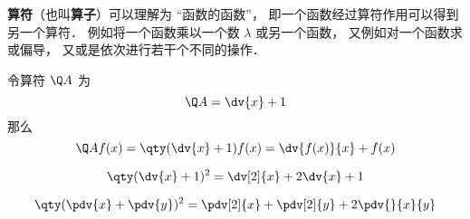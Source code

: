 

\textbf{算符}（也叫\textbf{算子}）可以理解为 “函数的函数”， 即一个函数经过算符作用可以得到另一个算符． 例如将一个函数乘以一个数 $\lambda$ 或另一个函数， 又例如对一个函数求或偏导， 又或是依次进行若干个不同的操作．

\begin{example}{}
令算符 $\Q A$ 为
\begin{equation}
\Q A = \dv{x} + 1
\end{equation}
那么
\begin{equation}
\Q A f(x) = \qty(\dv{x} + 1)f(x) = \dv{f(x)}{x} + f(x)
\end{equation}
\end{example}



\begin{equation}
\qty(\dv{x} + 1)^2 = \dv[2]{x} + 2\dv{x} + 1
\end{equation}

\begin{equation}
\qty(\pdv{x} + \pdv{y})^2 = \pdv[2]{x} + \pdv[2]{y} + 2\pdv{}{x}{y}
\end{equation}

